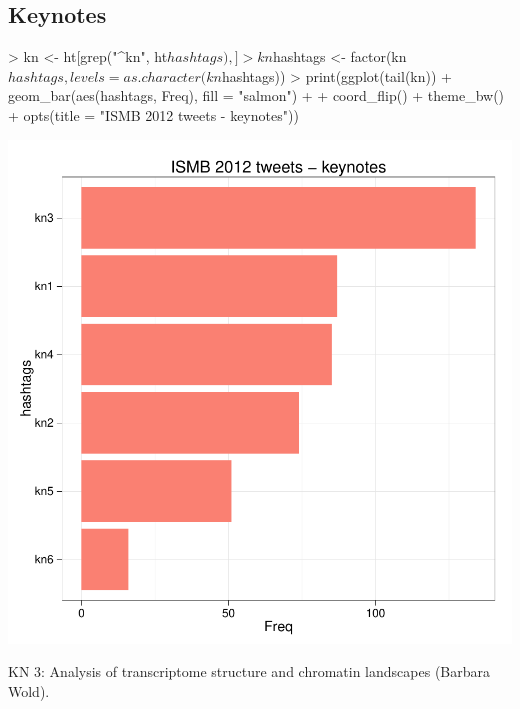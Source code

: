 \documentclass[a4paper,10pt]{article}
\begin{document}
\subsection{Keynotes}
\begin{center}
\begin{Schunk}
\begin{Sinput}
> kn <- ht[grep("^kn", ht$hashtags),]
> kn$hashtags <- factor(kn$hashtags, levels = as.character(kn$hashtags))
> print(ggplot(tail(kn)) + geom_bar(aes(hashtags, Freq), fill = "salmon") + 
+   coord_flip() + theme_bw() + opts(title = "ISMB 2012 tweets - keynotes"))
\end{Sinput}
\end{Schunk}
\includegraphics{ismb-005}
\end{center}

KN 3: Analysis of transcriptome structure and chromatin landscapes (Barbara Wold).

\newpage
\end{document}
